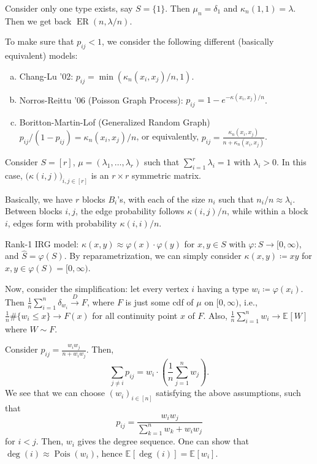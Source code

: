 \begin{eg}
	Consider only one type exists, say \(S = \{ 1 \} \). Then \(\mu _n = \delta _1\) and \(\kappa _n(1, 1) = \lambda \). Then we get back \(\operatorname{ER}(n, \lambda / n) \).
\end{eg}

To make sure that \(p_{ij} < 1\), we consider the following different (basically equivalent) models:
\begin{enumerate}[(a)]
	\item Chang-Lu '02: \(p_{ij} = \min (\kappa _n(x_i, x_j) / n , 1)\).
	\item Norros-Reittu '06 (Poisson Graph Process): \(p_{ij} = 1 - e^{- \kappa (x_i, x_j) / n}\).
	\item Boritton-Martin-Lof (Generalized Random Graph) \(p_{ij} / (1 - p_{ij}) = \kappa _n(x_i, x_j) / n\), or equivalently, \(p_{ij} = \frac{\kappa _n(x_i, x_j)}{n + \kappa _n(x_i, x_j)}\).
\end{enumerate}

\begin{eg}
	Consider \(S = [r]\), \(\mu = (\lambda _1, \dots , \lambda _r)\) such that \(\sum_{i=1}^{r} \lambda _i = 1\) with \(\lambda _i > 0\). In this case, \(\big(\kappa (i, j)\big)_{i, j \in [r]}\) is an \(r \times r\) symmetric matrix.

	Basically, we have \(r\) blocks \(B_i\)'s, with each of the size \(n_i\) such that \(n_i / n \approx \lambda _i\). Between blocks \(i, j\), the edge probability follows \(\kappa (i, j) / n\), while within a block \(i\), edges form with probability \(\kappa (i, i) / n\).
\end{eg}

Rank-1 IRG model: \(\kappa (x, y) \approx \varphi (x) \cdot \varphi (y)\) for \(x, y \in S\) with \(\varphi \colon S \to [0, \infty )\), and \(\hat{S} = \varphi (S)\). By reparametrization, we can simply consider \(\kappa (x, y) \coloneqq xy\) for \(x, y \in \varphi (S) = [0, \infty )\).

Now, consider the simplification: let every vertex \(i\) having a type \(w_i \coloneqq \varphi (x_i)\). Then \(\frac{1}{n}\sum_{i=1}^{n} \delta _{w_i} \overset{D}{\to} F\), where \(F\) is just some cdf of \(\mu \) on \([0, \infty )\), i.e., \(\frac{1}{n}\#\{ w_i \leq x \} \to F(x)\) for all continuity point \(x\) of \(F\). Also, \(\frac{1}{n} \sum_{i=1}^{n} w_i \to \mathbb{E}_{}[W] \) where \(W \sim F\).

Consider \(p_{ij} = \frac{w_i w_j}{n + w_i w_j}\). Then,
\[
	\sum_{j \neq i} p_{ij}
	= w_i \cdot \left( \frac{1}{n}\sum_{j=1}^{n} w_j \right).
\]
We see that we can choose \((w_i)_{i \in [n]}\) satisfying the above assumptions, such that
\[
	p_{ij}
	= \frac{w_i w_j}{\sum_{k=1}^{n} w_k + w_i w_j}
\]
for \(i < j\). Then, \(w_i\) gives the degree sequence. One can show that \(\deg (i) \approx \operatorname{Pois}(w_i) \), hence \(\mathbb{E}_{}[\deg (i)] = \mathbb{E}_{}[w_i] \).

